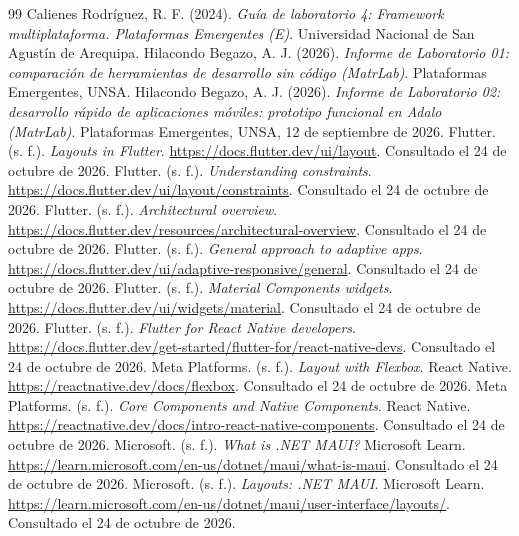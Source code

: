 \begin{thebibliography}{99}
 Calienes Rodríguez, R. F. (2024). \emph{Guía de laboratorio 4: Framework multiplataforma. Plataformas Emergentes (E)}. Universidad Nacional de San Agustín de Arequipa.
 Hilacondo Begazo, A. J. (2026). \emph{Informe de Laboratorio 01: comparación de herramientas de desarrollo sin código (MatrLab)}. Plataformas Emergentes, UNSA.
 Hilacondo Begazo, A. J. (2026). \emph{Informe de Laboratorio 02: desarrollo rápido de aplicaciones móviles: prototipo funcional en Adalo (MatrLab)}. Plataformas Emergentes, UNSA, 12 de septiembre de 2026.
 Flutter. (s. f.). \emph{Layouts in Flutter}. \url{https://docs.flutter.dev/ui/layout}. Consultado el 24 de octubre de 2026.
 Flutter. (s. f.). \emph{Understanding constraints}. \url{https://docs.flutter.dev/ui/layout/constraints}. Consultado el 24 de octubre de 2026.
 Flutter. (s. f.). \emph{Architectural overview}. \url{https://docs.flutter.dev/resources/architectural-overview}. Consultado el 24 de octubre de 2026.
 Flutter. (s. f.). \emph{General approach to adaptive apps}. \url{https://docs.flutter.dev/ui/adaptive-responsive/general}. Consultado el 24 de octubre de 2026.
 Flutter. (s. f.). \emph{Material Components widgets}. \url{https://docs.flutter.dev/ui/widgets/material}. Consultado el 24 de octubre de 2026.
 Flutter. (s. f.). \emph{Flutter for React Native developers}. \url{https://docs.flutter.dev/get-started/flutter-for/react-native-devs}. Consultado el 24 de octubre de 2026.
 Meta Platforms. (s. f.). \emph{Layout with Flexbox}. React Native. \url{https://reactnative.dev/docs/flexbox}. Consultado el 24 de octubre de 2026.
 Meta Platforms. (s. f.). \emph{Core Components and Native Components}. React Native. \url{https://reactnative.dev/docs/intro-react-native-components}. Consultado el 24 de octubre de 2026.
 Microsoft. (s. f.). \emph{What is .NET MAUI?} Microsoft Learn. \url{https://learn.microsoft.com/en-us/dotnet/maui/what-is-maui}. Consultado el 24 de octubre de 2026.
 Microsoft. (s. f.). \emph{Layouts: .NET MAUI}. Microsoft Learn. \url{https://learn.microsoft.com/en-us/dotnet/maui/user-interface/layouts/}. Consultado el 24 de octubre de 2026.
\end{thebibliography}
